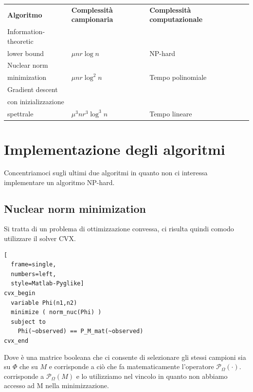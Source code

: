 \documentclass[12pt,a4paper]{report}
\begin{document}
\begin{table}[H]
  \centering
  \begin{tabular}{@{}lllll@{}}
    \cmidrule(r){1-3}
    \textbf{Algoritmo}                              & \textbf{Complessità campionaria} & \textbf{Complessità computazionale} &  &  \\ \cmidrule(r){1-3}
    Information-theoretic\\ lower bound               & $\mu n r \log n$                    & NP-hard                           &  &  \\ \cmidrule(r){1-3}
    Nuclear norm\\ minimization                       & $\mu n r \log^2 n$                  & Tempo polinomiale                   &  &  \\ \cmidrule(r){1-3}
    Gradient descent\\ con inizializzazione\\ spettrale & $\mu^3 n r^3 \log^3 n$              & Tempo lineare                       &  &  \\ \cmidrule(r){1-3}
  \end{tabular}
\end{table}


\chapter{Implementazione degli algoritmi}

Concentriamoci sugli ultimi due algoritmi in quanto
non ci interessa implementare un algoritmo NP-hard.

\section{Nuclear norm minimization}

Si tratta di un problema di ottimizzazione convessa,
ci risulta quindi comodo utilizzare il solver CVX.\\
\begin{lstlisting}[
  frame=single,
  numbers=left,
  style=Matlab-Pyglike]
cvx_begin
  variable Phi(n1,n2)
  minimize ( norm_nuc(Phi) )
  subject to
    Phi(~observed) == P_M_mat(~observed)
cvx_end
\end{lstlisting}
Dove  è una matrice booleana
che ci consente di selezionare
gli stessi campioni sia su $\Phi$ che su $M$
e corrisponde a ciò che fa matematicamente l'operatore
$\mathcal{P}_{\Omega}(\cdot)$.
 corrisponde a $\mathcal{P}_{\Omega}(M)$
e lo utilizziamo nel vincolo in quanto non abbiamo accesso ad M
nella minimizzazione.
\end{document}
